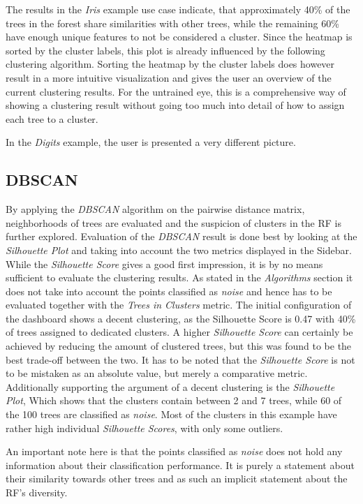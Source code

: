 \documentclass[a4paper, 12pt]{article}
\begin{document}
The results in the \textit{Iris} example use case indicate, that approximately 40\% of the trees in the
forest share similarities with other trees, while the remaining 60\% have enough unique features to not be
considered a cluster. Since the heatmap is sorted by the cluster labels, this plot is already influenced by
the following clustering algorithm. Sorting the heatmap by the cluster labels does however result in a more
intuitive visualization and gives the user an overview of the current clustering results. For the untrained
eye, this is a comprehensive way of showing a clustering result without going too much into detail of how
to assign each tree to a cluster. \par

In the \textit{Digits} example, the user is presented a very different picture.


\subsection{DBSCAN}
By applying the \textit{DBSCAN} algorithm on the pairwise distance matrix, neighborhoods of trees are evaluated
and the suspicion of clusters in the RF is further explored. Evaluation of the \textit{DBSCAN} result is done
best by looking at the \textit{Silhouette Plot} and taking into account the two metrics displayed in the
Sidebar. While the \textit{Silhouette Score} gives a good first impression, it is by no means sufficient to
evaluate the clustering results. As stated in the \textit{Algorithms} section it does not take into account the
points classified as \textit{noise} and hence has to be evaluated together with the \textit{Trees in Clusters}
metric. The initial configuration of the dashboard shows a decent clustering, as the Silhouette Score is 0.47
with 40\% of trees assigned to dedicated clusters. A higher \textit{Silhouette Score} can certainly be achieved
by reducing the amount of clustered trees, but this was found to be the best trade-off between the two. It has
to be noted that the \textit{Silhouette Score} is not to be mistaken as an absolute value, but merely a
comparative metric. Additionally supporting the argument of a decent clustering is the \textit{Silhouette Plot},
Which shows that the clusters contain between 2 and 7 trees, while 60 of the 100 trees are classified as
\textit{noise}. Most of the clusters in this example have rather high individual \textit{Silhouette Scores},
with only some outliers. \par
An important note here is that the points classified as \textit{noise} does not hold any information about their
classification performance. It is purely a statement about their similarity towards other trees and as such an
implicit statement about the RF's diversity.
\end{document}
